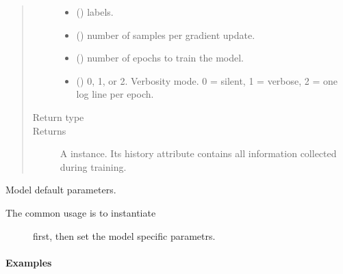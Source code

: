 \documentclass[letterpaper,10pt,english]{sphinxmanual}
\begin{document}
\begin{fulllineitems}
\begin{fulllineitems}
\begin{quote}
\begin{description}
\begin{itemize}
\item {} 
 () \textendash{} labels.

\item {} 
 () \textendash{} number of samples per gradient update.

\item {} 
 () \textendash{} number of epochs to train the model.

\item {} 
 () \textendash{} 0, 1, or 2. Verbosity mode. 0 = silent, 1 = verbose,
2 = one log line per epoch.

\end{itemize}

\item[{Return type}] \leavevmode
{}

\item[{Returns}] \leavevmode
A  instance. Its history attribute
contains all information collected during training.

\end{description}\end{quote}

\end{fulllineitems}


\begin{fulllineitems}
\label{\detokenize{matchzoo.engine:matchzoo.engine.base_model.BaseModel.get_default_params}}
Model default parameters.
\begin{description}
\item[{The common usage is to instantiate }] \leavevmode
first, then set the model specific parametrs.

\end{description}
\paragraph{Examples}


\end{fulllineitems}
\end{fulllineitems}
\end{document}
